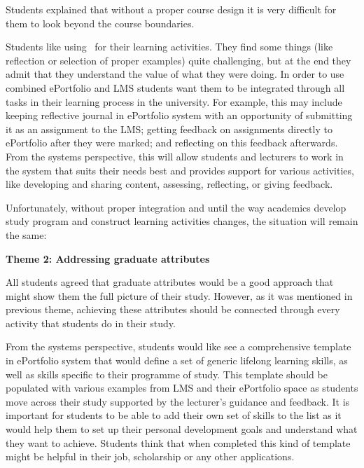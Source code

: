 Students explained that without a proper course design it is very difficult for
them to look beyond the course boundaries.


Students like using \ep~for their learning activities. They find some
things (like reflection or selection of proper examples) quite challenging, but
at the end they admit that they understand the value of what they were doing. In
order to use combined ePortfolio and LMS students want them to be integrated
through all tasks in their learning process in the university. For example, this
may include keeping reflective journal in ePortfolio system with an opportunity
of submitting it as an assignment to the LMS; getting feedback on assignments
directly to ePortfolio after they were marked; and reflecting on this feedback
afterwards. From the systems perspective, this will allow students and lecturers
to work in the system that suits their needs best and provides support for
various activities, like developing and sharing content, assessing, reflecting,
or giving feedback. 

Unfortunately, without proper integration and until the way academics develop
study program and construct learning activities changes, the situation will
remain the same:


\textbf{Theme 2: Addressing graduate attributes}

All students agreed that graduate attributes would be a good approach that might
show them the full picture of their study. However, as it was mentioned in
previous theme, achieving these attributes should be connected through every
activity that students do in their study.


From the systems perspective, students would like see a comprehensive template
in ePortfolio system that would define a set of generic lifelong learning
skills, as well as skills specific to their programme of study. This template should be populated with various examples from LMS and their ePortfolio space as students move
across their study supported by the lecturer’s guidance and feedback. It is important for students to be able to
add their own set of skills to the list as it would help them to set up their personal development goals and
understand what they want to achieve. Students think that when completed this kind of template might be helpful
in their job, scholarship or any other applications.

